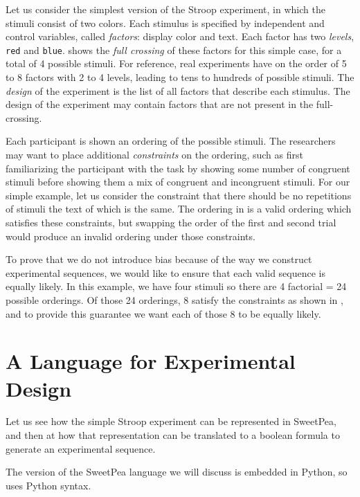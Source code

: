 Let us consider the simplest version of the Stroop experiment, in which the stimuli consist of two colors. Each stimulus is specified by independent and control variables, called \emph{factors}: display color and text. Each factor has two \emph{levels}, \texttt{red} and \texttt{blue}.  shows the \emph{full crossing} of these factors for this simple case, for a total of 4 possible stimuli. For reference, real experiments have on the order of 5 to 8 factors with 2 to 4 levels, leading to tens to hundreds of possible stimuli. The \emph{design} of the experiment is the list of all factors that describe each stimulus. The design of the experiment may contain factors that are not present in the full-crossing.

Each participant is shown an ordering of the possible stimuli. The researchers may want to place additional \emph{constraints} on the ordering, such as first familiarizing the participant with the task by showing some number of congruent stimuli before showing them a mix of congruent and incongruent stimuli. For our simple example, let us consider the constraint that there should be no repetitions of stimuli the text of which is the same. The ordering in  is a valid ordering which satisfies these constraints, but swapping the order of the first and second trial would produce an invalid ordering under those constraints.

To prove that we do not introduce bias because of the way we construct experimental sequences, we would like to ensure that each valid sequence is equally likely. In this example, we have four stimuli so there are 4 factorial = 24 possible orderings. Of those 24 orderings, 8 satisfy the constraints as shown in , and to provide this guarantee we want each of those 8 to be equally likely.






\section{A Language for Experimental Design}

Let us see how the simple Stroop experiment can be represented in SweetPea, and then at how that representation can be translated to a boolean formula to generate an experimental sequence.

The version of the SweetPea language we will discuss is embedded in Python, so uses Python syntax.

